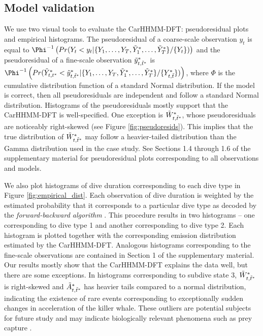 \subsection{Model validation}
\label{subsec:model_validation}

We use two visual tools to evaluate the CarHHMM-DFT: pseudoresidual plots and empirical histograms. The pseudoresidual of a coarse-scale observation $y_t$ is equal to $\Phi^{-1} \left(Pr(Y_t < y_t|\{Y_1,\ldots,Y_T,\Z_1,\ldots,\Z_T\}/\{Y_t\}) \right)$ and the pseudoresidual of a fine-scale observation $\tilde{y}^*_{t,\tilde t^*}$ is $\Phi^{-1} \left(Pr(\Z_{t,t^*} < \z_{t,\tilde t^*}|\{Y_1,\ldots,Y_T,\Z_1,\ldots,\Z_T\}/\{Y^*_{t,\tilde t}\}) \right)$, where $\Phi$ is the cumulative distribution function of a standard Normal distribution. If the model is correct, then all pseudoresiduals are independent and follow a standard Normal distribution. Histograms of the pseudoresiduals mostly support that the CarHHMM-DFT is well-specified. One exception is $\tilde{W}^*_{t,\tilde t^*}$, whose pseudoresiduals are noticeably right-skewed (see Figure \ref{fig:pseudoresids}). This implies that the true distribution of $\tilde{W}^*_{t,\tilde t^*}$ may follow a heavier-tailed distribution than the Gamma distribution used in the case study. See Sections 1.4 through 1.6 of the supplementary material for pseudoresidual plots corresponding to all observations and models.

We also plot histograms of dive duration corresponding to each dive type in Figure \ref{fig:empirical_dist}. Each observation of dive duration is weighted by the estimated probability that it corresponds to a particular dive type as decoded by the \textit{forward-backward algorithm} \citep{Zucchini:2016}. This procedure results in two histograms -- one corresponding to dive type 1 and another corresponding to dive type 2. Each histogram is plotted together with the corresponding emission distribution estimated by the CarHHMM-DFT. Analogous histograms corresponding to the fine-scale observations are contained in Section 1 of the supplementary material. Our results mostly show that the CarHHMM-DFT explains the data well, but there are some exceptions. In histograms corresponding to subdive state 3, $\tilde{W}^*_{t,\tilde t^*}$ is right-skewed and $\tilde{A}^*_{t,\tilde t^*}$ has heavier tails compared to a normal distribution, indicating the existence of rare events corresponding to exceptionally sudden changes in acceleration of the killer whale. These outliers are potential subjects for future study and may indicate biologically relevant phenomena such as prey capture \citep{Tennessen:2019a}.

